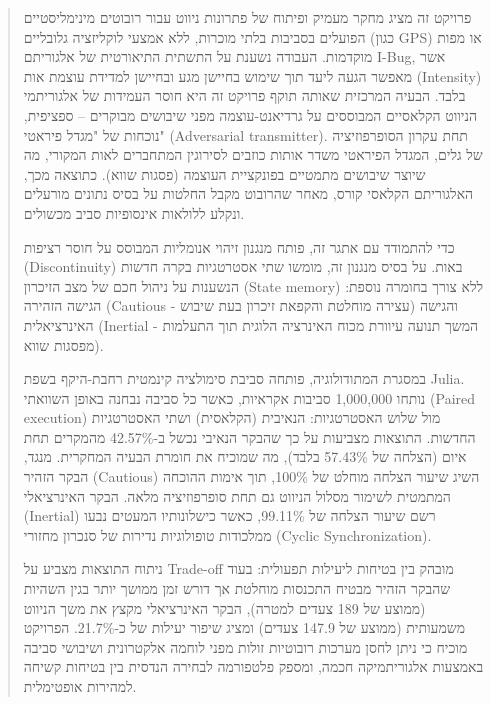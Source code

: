 \documentclass[12pt, a4paper]{article}
\begin{document}
 

\tableofcontents
\newpage

\renewcommand{\listfigurename}{רשימת איורים}
\renewcommand{\listtablename}{רשימת טבלאות}
\listoffigures
\vspace{1.5cm} %
\listoftables
\newpage

\begin{abstract}
פרויקט זה מציג מחקר מעמיק ופיתוח של פתרונות ניווט עבור רובוטים מינימליסטיים הפועלים בסביבות בלתי מוכרות, ללא אמצעי לוקליזציה גלובליים (כגון \textenglish{GPS}) או מפות מוקדמות. העבודה נשענת על התשתית התיאורטית של אלגוריתם \textenglish{I-Bug}, אשר מאפשר הגעה ליעד תוך שימוש בחיישן מגע ובחיישן למדידת עוצמת אות (\textenglish{Intensity}) בלבד. הבעיה המרכזית שאותה תוקף פרויקט זה היא חוסר העמידות של אלגוריתמי הניווט הקלאסיים המבוססים על גרדיאנט-עוצמה מפני שיבושים מבוקרים – ספציפית, נוכחות של "מגדל פיראטי" (\textenglish{Adversarial transmitter}). תחת עקרון הסופרפוזיציה של גלים, המגדל הפיראטי משדר אותות כוזבים לסירוגין המתחברים לאות המקורי, מה שיוצר שיבושים מתמטיים בפונקציית העוצמה (פסגות שווא). כתוצאה מכך, האלגוריתם הקלאסי קורס, מאחר שהרובוט מקבל החלטות על בסיס נתונים מורעלים ונקלע ללולאות אינסופיות סביב מכשולים.

כדי להתמודד עם אתגר זה, פותח מנגנון זיהוי אנומליות המבוסס על חוסר רציפות (\textenglish{Discontinuity}) באות. על בסיס מנגנון זה, מומשו שתי אסטרטגיות בקרה חדשות הנשענות על ניהול חכם של מצב הזיכרון (\textenglish{State memory}) ללא צורך בחומרה נוספת: הגישה הזהירה (\textenglish{Cautious} - עצירה מוחלטת והקפאת זיכרון בעת שיבוש) והגישה האינרציאלית (\textenglish{Inertial} - המשך תנועה עיוורת מכוח האינרציה הלוגית תוך התעלמות מפסגות שווא).

במסגרת המתודולוגיה, פותחה סביבת סימולציה קינמטית רחבת-היקף בשפת \textenglish{Julia}. נותחו 1,000,000 סביבות אקראיות, כאשר כל סביבה נבחנה באופן השוואתי (\textenglish{Paired execution}) מול שלוש האסטרטגיות: הנאיבית (הקלאסית) ושתי האסטרטגיות החדשות. התוצאות מצביעות על כך שהבקר הנאיבי נכשל ב-42.57\% מהמקרים תחת איום (הצלחה של 57.43\% בלבד), מה שמוכיח את חומרת הבעיה המחקרית. מנגד, הבקר הזהיר (\textenglish{Cautious}) השיג שיעור הצלחה מוחלט של 100\%, תוך אימות ההוכחה המתמטית לשימור מסלול הניווט גם תחת סופרפוזיציה מלאה. הבקר האינרציאלי (\textenglish{Inertial}) רשם שיעור הצלחה של 99.11\%, כאשר כישלונותיו המעטים נבעו ממלכודות טופולוגיות נדירות של סנכרון מחזורי (\textenglish{Cyclic Synchronization}).

ניתוח התוצאות מצביע על \textenglish{Trade-off} מובהק בין בטיחות ליעילות תפעולית: בעוד שהבקר הזהיר מבטיח התכנסות מוחלטת אך דורש זמן ממושך יותר בגין השהיות (ממוצע של 189 צעדים למטרה), הבקר האינרציאלי מקצץ את משך הניווט משמעותית (ממוצע של 147.9 צעדים) ומציג שיפור יעילות של כ-21.7\%. הפרויקט מוכיח כי ניתן לחסן מערכות רובוטיות זולות מפני לוחמה אלקטרונית ושיבושי סביבה באמצעות אלגוריתמיקה חכמה, ומספק פלטפורמה לבחירה הנדסית בין בטיחות קשיחה למהירות אופטימלית.
\end{abstract}
\newpage
\end{document}
